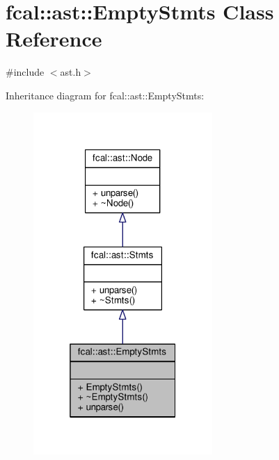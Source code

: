 \hypertarget{classfcal_1_1ast_1_1EmptyStmts}{}\section{fcal\+:\+:ast\+:\+:Empty\+Stmts Class Reference}
\label{classfcal_1_1ast_1_1EmptyStmts}


{\ttfamily \#include $<$ast.\+h$>$}



Inheritance diagram for fcal\+:\+:ast\+:\+:Empty\+Stmts\+:
\nopagebreak
\begin{figure}[H]
\begin{center}
\leavevmode
\includegraphics[width=193pt]{classfcal_1_1ast_1_1EmptyStmts__inherit__graph}
\end{center}
\end{figure}


